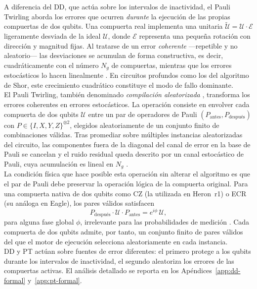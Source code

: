 \documentclass[12pt, spanish]{book}
\begin{document}
A diferencia del DD, que actúa sobre los intervalos de inactividad, el Pauli Twirling aborda los errores que ocurren \textit{durante} la ejecución de las propias compuertas de dos qubits. Una compuerta real implementa una unitaria $\tilde{\mathcal{U}} = \mathcal{U}\cdot\mathcal{E}$ ligeramente desviada de la ideal $\mathcal{U}$, donde $\mathcal{E}$ representa una pequeña rotación con dirección y magnitud fijas. Al tratarse de un error \textit{coherente} ---repetible y no aleatorio--- las desviaciones se acumulan de forma constructiva, es decir, cuadráticamente con el número $N_g$ de compuertas, mientras que los errores estocásticos lo hacen linealmente \cite{Wallman2016, ibm_error_mitigation}. En circuitos profundos como los del algoritmo de Shor, este crecimiento cuadrático constituye el modo de fallo dominante.\\

El Pauli Twirling, también denominado \textit{compilación aleatorizada} \cite{Wallman2016}, transforma los errores coherentes en errores estocásticos. La operación consiste en envolver cada compuerta de dos qubits $\mathcal{U}$ entre un par de operadores de Pauli $(P_{\text{antes}}, P_{\text{después}})$ con $P \in \{I, X, Y, Z\}^{\otimes 2}$, elegidos aleatoriamente de un conjunto finito de combinaciones válidas. Tras promediar sobre múltiples instancias aleatorizadas del circuito, las componentes fuera de la diagonal del canal de error en la base de Pauli se cancelan y el ruido residual queda descrito por un canal estocástico de Pauli, cuya acumulación es lineal en $N_g$ \cite{CaiBenjamin2018, ibm_error_mitigation}.\\

La condición física que hace posible esta operación sin alterar el algoritmo es que el par de Pauli debe preservar la operación lógica de la compuerta original. Para una compuerta nativa de dos qubits como CZ (la utilizada en Heron~r1) o ECR (su análoga en Eagle), los pares válidos satisfacen
\begin{equation}
    P_{\text{después}} \cdot \mathcal{U} \cdot P_{\text{antes}} = e^{i\phi}\, \mathcal{U},
    \label{eq:pt_preservation}
\end{equation}
para alguna fase global $\phi$, irrelevante para las probabilidades de medición \cite{ibm_error_mitigation}. Cada compuerta de dos qubits admite, por tanto, un conjunto finito de pares válidos del que el motor de ejecución selecciona aleatoriamente en cada instancia.\\

DD y PT actúan sobre fuentes de error diferentes: el primero protege a los qubits durante los intervalos de inactividad, el segundo aleatoriza los errores de las compuertas activas. El análisis detallado se reporta en los Apéndices~\ref{app:dd-formal} y~\ref{app:pt-formal}.
\end{document}
